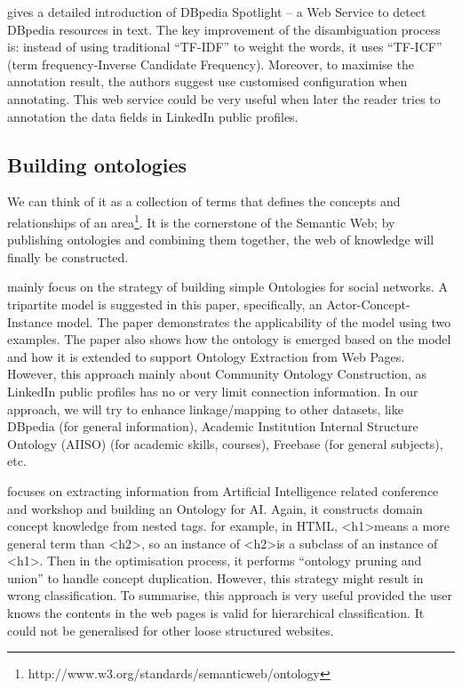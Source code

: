 \cite{mendes2011} gives a detailed introduction of DBpedia Spotlight -- a Web Service to detect DBpedia resources in text. The key improvement of the disambiguation process is: instead of using traditional ``TF-IDF'' to weight the words, it uses ``TF-ICF'' (term frequency-Inverse Candidate Frequency). Moreover, to maximise the annotation result, the authors suggest use customised configuration when annotating. This web service could be very useful when later the reader tries to annotation the data fields in LinkedIn public profiles.

\subsection{Building ontologies}

We can think of it as a collection of terms that  defines the concepts and relationships of an area\footnote{http://www.w3.org/standards/semanticweb/ontology}. It is the cornerstone of the Semantic Web; by publishing ontologies and combining them together, the web of knowledge will finally be constructed. 

\cite{mika2007} mainly focus on the strategy of building simple Ontologies for social networks. A tripartite model is suggested in this paper, specifically, an Actor-Concept-Instance model. The paper demonstrates the applicability of the model using two examples. The paper also shows how the ontology is emerged based on the model and how it is extended to support Ontology Extraction from Web Pages. However, this approach mainly about Community Ontology Construction, as LinkedIn public profiles has no or very limit connection information. In our approach, we will try to enhance linkage/mapping to other datasets, like DBpedia (for general information), Academic Institution Internal Structure Ontology (AIISO) (for academic skills, courses), Freebase (for general subjects), etc.

\cite{wang2011} focuses on extracting information from Artificial Intelligence related conference and workshop and building an Ontology for AI. Again, it constructs domain concept knowledge from nested tags. for example, in HTML, \textless h1\textgreater means a more general term than \textless h2\textgreater, so an instance of \textless h2\textgreater is a subclass of an instance of \textless h1\textgreater. Then in the optimisation process, it performs ``ontology pruning and union'' to handle concept duplication. However, this strategy might result in wrong classification. To summarise, this approach is very useful provided the user knows the contents in the web pages is valid for hierarchical classification. It could not be generalised for other loose structured websites.

